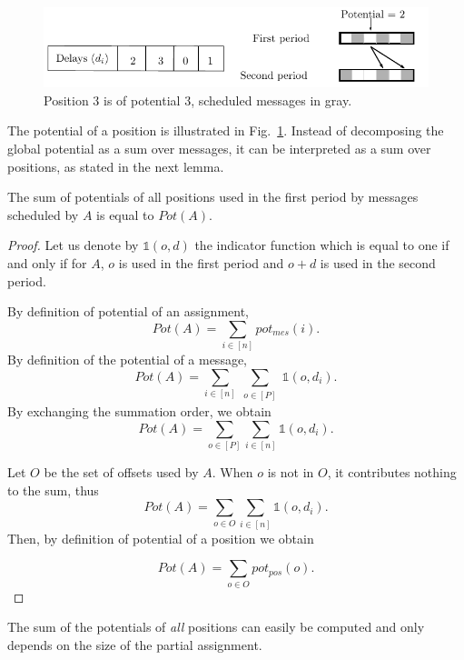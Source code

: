 \documentclass[a4paper,UKenglish,cleveref, autoref, thm-restate]{lipics-v2019}
\begin{document}
\begin{figure}
\begin{center}
\includegraphics[scale=1]{positionspotential}
\end{center}
\caption{Position $3$ is of potential $3$, scheduled messages in gray.}
\label{fig:positionpotential}
\end{figure}

The potential of a position is illustrated in Fig.~\ref{fig:positionpotential}.
Instead of decomposing the global potential as a sum over messages, it can be interpreted
as a sum over positions, as stated in the next lemma.

\begin{lemma}\label{lemma:pot_pos}
The sum of potentials of all positions used in the first period by messages scheduled by $A$ is equal to $Pot(A)$.  
\end{lemma}
\begin{proof}
 Let us denote by $\mathbb{1}(o,d)$ the indicator function which is equal to one if and only if for $A$, $o$ is used in the first period and $o+d$ is used in the second period.

By definition of potential of an assignment, 
$$Pot(A) = \sum_{i \in [n]} pot_{mes}(i).$$
By definition of the potential of a message, 
$$\displaystyle{Pot(A) = \sum_{i \in [n]} \sum_{\substack{o \in [P]}} \mathbb{1}(o,d_i) }.$$
By exchanging the summation order, we obtain
$$\displaystyle{Pot(A) = \sum_{o \in [P] }\sum_{i \in [n]} \mathbb{1}(o,d_i) }.$$

Let $O$ be the set of offsets used by $A$.
When $o$ is not in $O$, it contributes nothing to the sum, thus
$$\displaystyle{Pot(A) = \sum_{o \in O} \sum_{i \in [n]} \mathbb{1}(o,d_i) }.$$
Then, by definition of potential of a position we obtain

$$\displaystyle{Pot(A) = \sum_{o \in O} pot_{pos}(o)}.$$
\end{proof}

The sum of the potentials of \emph{all} positions can easily be computed and only depends on the size of the partial assignment.
\end{document}
